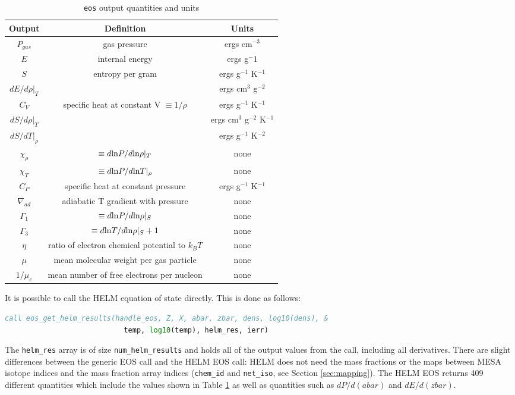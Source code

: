 \begin{table}[h]
\begin{center}
\begin{tabular}{ccc}
Output & Definition & Units \\ \hline
$P_{gas}$ & gas pressure & ergs cm$^{-3}$ \\
$E$ & internal energy & ergs g$^-{1}$ \\
$S$ & entropy per gram & ergs g$^{-1}$ K$^{-1}$ \\
$dE/d\rho|_T$ & & ergs cm$^3$ g$^{-2}$ \\
$C_V$ & specific heat at constant V $\equiv 1/\rho$ & ergs g$^{-1}$ K$^{-1}$ \\
$dS/d\rho|_T$ & & ergs cm$^3$ g$^{-2}$ K$^{-1}$ \\
$dS/dT|_\rho$ & & ergs g$^{-1}$ K$^{-2}$ \\
$\chi_\rho$ & $\equiv d{\rm ln}P/d{\rm ln}\rho|_T$ & none \\
$\chi_T$ & $\equiv d{\rm ln}P/d{\rm ln}T|_\rho$ & none \\
$C_P$ & specific heat at constant pressure & ergs g$^{-1}$ K$^{-1}$ \\
$\nabla_{ad}$ & adiabatic T gradient with pressure & none \\
$\Gamma_1$ & $\equiv d{\rm ln}P/d{\rm ln}\rho|_S$ & none \\
$\Gamma_3$ & $\equiv d{\rm ln}T/d{\rm ln}\rho|_S + 1$ & none \\
$\eta$ & ratio of electron chemical potential to $k_BT$ & none \\
$\mu$ & mean molecular weight per gas particle & none \\
$1/\mu_e$ & mean number of free electrons per nucleon & none \\ \hline
\end{tabular}
\caption{{\tt eos} output quantities and units}
\label{tab:res}
\end{center}
\end{table}

It is possible to call the HELM equation of state directly. This is done as 
follows:
\begin{lstlisting}[language=fortran,mathescape=false]
  call eos_get_helm_results(handle_eos, Z, X, abar, zbar, dens, log10(dens), &
                            temp, log10(temp), helm_res, ierr)
\end{lstlisting}
The {\tt helm\_res} array is of size {\tt num\_helm\_results} and holds all 
of the output 
values from the call, including all derivatives. 
There are slight differences between the generic EOS call and the HELM EOS 
call: HELM does not need the mass fractions or the maps between 
{\sf MESA} isotope indices and the mass fraction array indices ({\tt chem\_id} 
and {\tt net\_iso}, see Section \ref{sec:mapping}). The HELM EOS returns 409 
different quantities which include the values shown in 
Table \ref{tab:res} as well as quantities such as $dP/d(abar)$ and 
$dE/d(zbar)$. 

